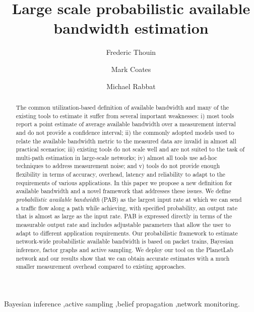 \documentclass[final,5p,times,twocolumn]{elsarticle}
\begin{document}
\begin{frontmatter}





\title{Large scale probabilistic available bandwidth estimation}



\author[mcgill]{Frederic Thouin}

\author[mcgill]{Mark Coates}

\author[mcgill]{Michael Rabbat}


\address[mcgill]{McGill University, Department of Electrical and Computer Engineering, 3480 University, Montreal, Quebec, Canada, H2A 3A7}

\begin{abstract}


  The common utilization-based definition of available bandwidth and many of the existing tools to estimate it suffer from several important weaknesses: i) most tools report a point estimate of average available bandwidth over a measurement interval and do not provide a confidence interval; ii) the commonly adopted models used to relate the available bandwidth metric to the measured data are invalid in almost all practical scenarios; iii) existing tools do not scale well and are not suited to the task of multi-path estimation in large-scale networks; iv) almost all tools use ad-hoc techniques to address measurement noise; and v) tools do not provide enough flexibility in terms of accuracy, overhead, latency and reliability to adapt to the requirements of various applications.  In this paper we propose a new definition for available bandwidth and a novel framework that addresses these issues.  We define {\em probabilistic available bandwidth} (PAB) as the largest input rate at which we can send a traffic flow along a path while achieving, with specified probability, an output rate that is almost as large as the input rate.  PAB is expressed directly in terms of the measurable output rate and includes adjustable parameters that allow the user to adapt to different application requirements.  Our probabilistic framework to estimate network-wide probabilistic available bandwidth is based on packet trains, Bayesian inference, factor graphs and active sampling.  We deploy our tool on the PlanetLab network and our results show that we can obtain accurate estimates with a much smaller measurement overhead compared to existing approaches.  \end{abstract}

\begin{keyword}
Bayesian inference \sep active sampling \sep belief propagation \sep network monitoring.


\end{keyword}

\end{frontmatter}
\end{document}
